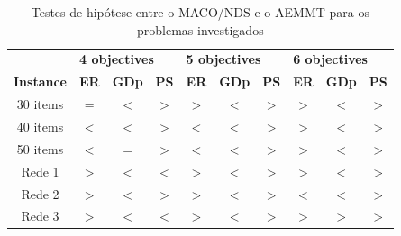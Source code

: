 \begin{table}[htb]
	\centering
	\def\arraystretch{1.0}
	\caption{Testes de hipótese entre o MACO/NDS e o AEMMT para os problemas investigados}
	\label{tab_ztest_meamt}
	\begin{tabular}{cccccccccc}
		& \multicolumn{3}{l}{\textbf{4 objectives}} & \multicolumn{3}{l}{\textbf{5 objectives}} & \multicolumn{3}{l}{\textbf{6 objectives
		}} \\
		\textbf{Instance} & \textbf{ER} & \textbf{GDp} & \textbf{PS} & \textbf{ER} & \textbf{GDp} & \textbf{PS} & \textbf{ER} & \textbf{GDp} & \textbf{PS} \\ \hline
		30 items & \cellcolor{white} $=$ & \cellcolor{table-green} $<$ & \cellcolor{table-green} $>$ & \cellcolor{table-red} $>$ & \cellcolor{table-green} $<$ & \cellcolor{table-green} $>$ & \cellcolor{table-red} $>$ & \cellcolor{table-green} $<$ & \cellcolor{table-green} $>$ \\
		40 items & \cellcolor{table-green} $<$ & \cellcolor{table-green} $<$ & \cellcolor{table-green} $>$ & \cellcolor{table-green} $<$ & \cellcolor{table-green} $<$ & \cellcolor{table-green} $>$ & \cellcolor{table-red} $>$ & \cellcolor{table-green} $<$ & \cellcolor{table-green} $>$ \\
		50 items & \cellcolor{table-green} $<$ & \cellcolor{white} $=$ & \cellcolor{table-green} $>$ & \cellcolor{table-green} $<$ & \cellcolor{table-green} $<$ & \cellcolor{table-green} $>$ & \cellcolor{table-red} $>$ & \cellcolor{table-green} $<$ & \cellcolor{table-green} $>$ \\  \hline 
		Rede 1 & \cellcolor{table-red} $>$ & \cellcolor{table-green} $<$ & \cellcolor{table-red} $<$ & \cellcolor{table-red} $>$ & \cellcolor{table-green} $<$ & \cellcolor{table-green} $>$ & \cellcolor{table-red} $>$ & \cellcolor{table-green} $<$ & \cellcolor{table-green} $>$ \\
		Rede 2 & \cellcolor{table-red} $>$ & \cellcolor{table-green} $<$ & \cellcolor{table-green} $>$ & \cellcolor{table-red} $>$ & \cellcolor{table-green} $<$ & \cellcolor{table-green} $>$ & \cellcolor{table-green} $<$ & \cellcolor{table-green} $<$ & \cellcolor{table-green} $>$ \\
		Rede 3 & \cellcolor{table-red} $>$ & \cellcolor{table-green} $<$ & \cellcolor{table-red} $<$ & \cellcolor{table-red} $>$ & \cellcolor{table-green} $<$ & \cellcolor{table-green} $>$ & \cellcolor{table-red} $>$ & \cellcolor{table-red} $>$ & \cellcolor{table-green} $>$ \\  \hline 
	\end{tabular}
\end{table}

